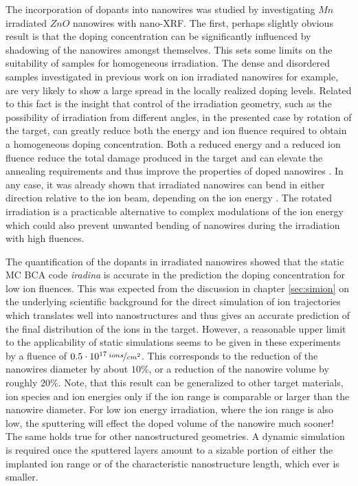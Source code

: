 The incorporation of dopants into nanowires was studied by investigating $Mn$ irradiated $ZnO$ nanowires with nano-XRF. The first, perhaps slightly obvious result is that the doping concentration can be significantly influenced by shadowing of the nanowires amongst themselves. This sets some limits on the suitability of samples for homogeneous irradiation. The dense and disordered samples investigated in previous work on ion irradiated nanowires \cite{geburt_rare_2008,ronning_ion_2010,kaiser_defect_2011,geburt_lasing_2012,geburt_intense_2013,kaiser_luminescence_2013,geburt_intense_2014,chu_nano-x-ray_2014} for example, are very likely to show a large spread in the locally realized doping levels. Related to this fact is the insight that control of the irradiation geometry, such as the possibility of irradiation from different angles, in the presented case by rotation of the target, can greatly reduce both the energy and ion fluence required to obtain a homogeneous doping concentration. Both a reduced energy and a reduced ion fluence reduce the total damage produced in the target and can elevate the annealing requirements and thus improve the properties of doped nanowires \cite{borschel_new_2011,paschoal_hopping_2012,borschel_ion-solid_2012,kumar_magnetic_2013,paschoal_magnetoresistance_2014}. In any case, it was already shown that irradiated nanowires can bend in either direction relative to the ion beam, depending on the ion energy \cite{borschel_permanent_2011}. The rotated irradiation is a practicable alternative to complex modulations of the ion energy which could also prevent unwanted bending of nanowires during the irradiation with high fluences.

The quantification of the dopants in irradiated nanowires showed that the static MC BCA code \emph{iradina} is accurate in the prediction the doping concentration for low ion fluences. This was expected from the discussion in chapter \ref{sec:simion} on the underlying scientific background for the direct simulation of ion trajectories which translates well into nanostructures and thus gives an accurate prediction of the final distribution of the ions in the target. However, a reasonable upper limit to the applicability of static simulations seems to be given in these experiments by a fluence of $0.5\cdot 10^{17}\,\nicefrac{ions}{cm^2}$. This corresponds to the reduction of the nanowires diameter by about $10\%$, or a reduction of the nanowire volume by roughly $20\%$. Note, that this result can be generalized to other target materials, ion species and ion energies only if the ion range is comparable or larger than the nanowire diameter. For low ion energy irradiation, where the ion range is also low, the sputtering will effect the doped volume of the nanowire much sooner! The same holds true for other nanostructured geometries. A dynamic simulation is required once the sputtered layers amount to a sizable portion of either the implanted ion range or of the characteristic nanostructure length, which ever is smaller. 

